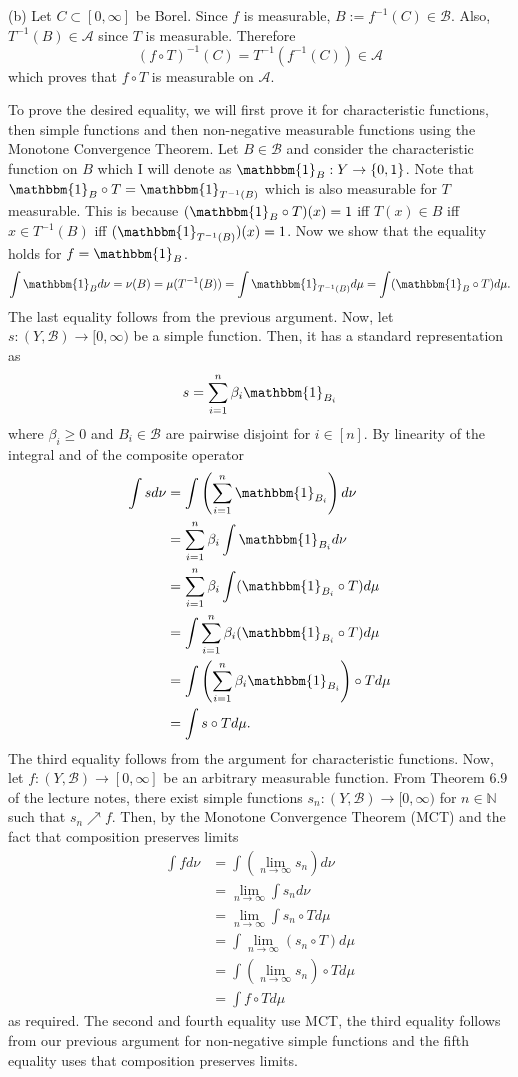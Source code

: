 \documentclass[12pt]{amsart} %
\def\N{\mathbb{N}}
\def\B{\mathcal{B}}
\def\A{\mathcal{A}}
\def\1{\mathbbm{1}}
\begin{document}
\newpage

\noindent
(b) Let $C \subset [0,\infty]$ be Borel. Since $f$ is measurable, $B:=f^{-1}(C) \in \B$. Also, $T^{-1}(B) \in \A$ since $T$ is measurable. Therefore 
$$\left( f \circ T \right)^{-1} (C) = T^{-1}(f^{-1}(C)) \in \A$$ which proves that $f\circ T$ is measurable on $\A$.

To prove the desired equality, we will first prove it for characteristic functions, then simple functions and then non-negative measurable functions using the Monotone Convergence Theorem. Let $B \in \B$ and consider the characteristic function on $B$ which I will denote as $\1_B: Y \to \{0,1\} $. Note that $\1_B \circ T = \1_{T^{-1}(B)}$ which is also measurable for $T$ measurable. This is because $(\1_B \circ T)(x) = 1$ iff  $T(x) \in B$ iff $x \in T^{-1}(B)$ iff $(\1_{T^{-1}(B)})(x) = 1$. Now we show that the equality holds for $f = \1_B$. 
$$\int \1_B d\nu = \nu(B) = \mu(T^{-1}(B)) = \int \1_{T^{-1}(B)} d\mu = \int (\1_B \circ T) d\mu.$$ 
The last equality follows from the previous argument. Now, let $s: (Y, \B) \to [0,\infty)$ be a simple function. Then, it has a standard representation as 
$$s = \sum_{i=1}^{n} \beta_i \1_{B_i}$$ where $\beta_i \ge 0$ and $B_i \in \B$ are pairwise disjoint for $i \in [n]$. By linearity of the integral and of the composite operator
\begin{align*}
	\int s d\nu &= \int \left(\sum_{i=1}^{n} \1_{B_i}\right) d\nu \\
		      &= \sum_{i=1}^{n} \beta_i \int  \1_{B_i} d\nu \\
		      &= \sum_{i=1}^{n} \beta_i \int ( \1_{B_i} \circ T) d\mu \\
		      &= \int \sum_{i=1}^{n} \beta_i ( \1_{B_i} \circ T) d\mu \\
		      &= \int \left(\sum_{i=1}^{n} \beta_i  \1_{B_i}\right) \circ T d\mu \\
		      &= \int s \circ T d\mu.
\end{align*}
The third equality follows from the argument for characteristic functions. Now, let $f: (Y, \B) \to [0,\infty]$ be an arbitrary measurable function. From Theorem 6.9 of the lecture notes, there exist simple functions $s_n: (Y, \B) \to [0,\infty)$ for $n \in \N$ such that $s_n \nearrow f$. Then, by the Monotone Convergence Theorem (MCT) and the fact that composition preserves limits
\begin{align*}
	\int f d\nu &= \int \left(\lim_{n \to \infty}s_n\right) d\nu \\
		    &= \lim_{n \to \infty} \int s_n d\nu \\
		    &= \lim_{n \to \infty} \int s_n\circ T d\mu \\
		    &= \int \lim_{n \to \infty} \left(s_n \circ T\right) d\mu \\
		    &= \int \left( \lim_{n \to \infty} s_n \right) \circ T d\mu \\
		    &= \int f\circ T d\mu
\end{align*}
as required. The second and fourth equality use MCT, the third equality follows from our previous argument for non-negative simple functions and the fifth equality uses that composition preserves limits. 
 
\end{document}
